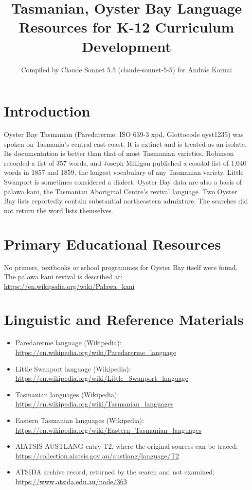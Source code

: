 \documentclass[12pt]{article}
\title{Tasmanian, Oyster Bay Language Resources for K-12 Curriculum Development}
\author{Compiled by Claude Sonnet 5.5 (claude-sonnet-5-5) for Andr\'as Kornai}
\date{}
\begin{document}
\maketitle

\section{Introduction}
Oyster Bay Tasmanian (Paredarerme; ISO 639-3 xpd, Glottocode oyst1235) was spoken on Tasmania's central east coast. It is extinct and is treated as an isolate. Its documentation is better than that of most Tasmanian varieties. Robinson recorded a list of 357 words, and Joseph Milligan published a coastal list of 1,040 words in 1857 and 1859, the longest vocabulary of any Tasmanian variety. Little Swanport is sometimes considered a dialect. Oyster Bay data are also a basis of palawa kani, the Tasmanian Aboriginal Centre's revival language. Two Oyster Bay lists reportedly contain substantial northeastern admixture. The searches did not return the word lists themselves.

\section{Primary Educational Resources}
No primers, textbooks or school programmes for Oyster Bay itself were found. The palawa kani revival is described at: \url{https://en.wikipedia.org/wiki/Palawa_kani}

\section{Linguistic and Reference Materials}
\begin{itemize}
\item Paredarerme language (Wikipedia): \url{https://en.wikipedia.org/wiki/Paredarerme_language}
\item Little Swanport language (Wikipedia): \url{https://en.wikipedia.org/wiki/Little_Swanport_language}
\item Tasmanian languages (Wikipedia): \url{https://en.wikipedia.org/wiki/Tasmanian_languages}
\item Eastern Tasmanian languages (Wikipedia): \url{https://en.wikipedia.org/wiki/Eastern_Tasmanian_languages}
\item AIATSIS AUSTLANG entry T2, where the original sources can be traced: \url{https://collection.aiatsis.gov.au/austlang/language/T2}
\item ATSIDA archive record, returned by the search and not examined: \url{https://www.atsida.edu.au/node/363}
\end{itemize}
\end{document}
